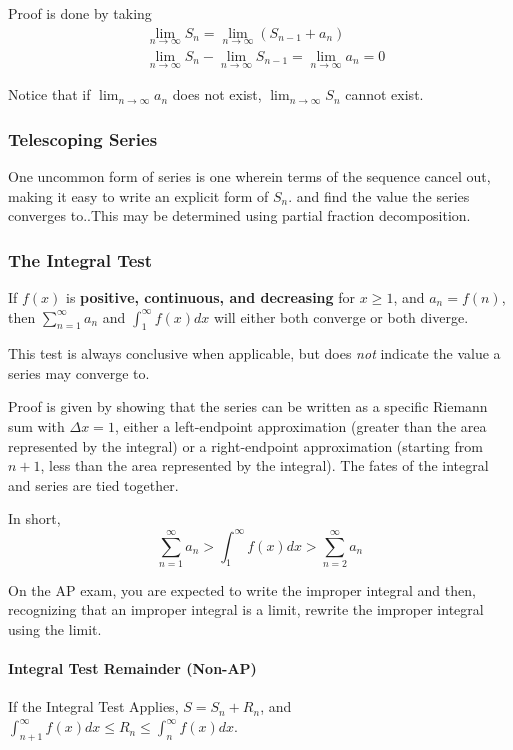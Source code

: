 \documentclass{article}
\begin{document}
Proof is done by taking
\begin{align*}
    &\lim_{n\to \infty} S_n = \lim_{n\to \infty} \left( S_{n-1} + a_{n} \right) \\
    &\lim_{n\to \infty} S_n - \lim_{n\to \infty} S_{n-1} = \lim_{n\to \infty} a_n = 0
\end{align*}

Notice that if $\lim_{n\to \infty} a_n$ does not exist, $\lim_{n\to \infty} S_n$ cannot exist.

\subsubsection{Telescoping Series} One uncommon form of series is one wherein terms of the sequence cancel out, making it easy to write an explicit form of $S_n$. and find the value the series converges to..This may be determined using partial fraction decomposition.

\subsubsection{The Integral Test} If $f(x)$ is \textbf{positive, continuous, and decreasing} for $x\ge1$, and $a_n = f(n)$, then $\sum_{n=1}^{\infty} a_n$ and $\int_{1}^{\infty} f(x) dx$ will either both converge or both diverge.

This test is always conclusive when applicable, but does \emph{not} indicate the value a series may converge to.

Proof is given by showing that the series can be written as a specific Riemann sum with $\Delta x = 1$, either a left-endpoint approximation (greater than the area represented by the integral) or a right-endpoint approximation (starting from $n+1$, less than the area represented by the integral). The fates of the integral and series are tied together.

In short,
$$\sum_{n=1}^{\infty} a_n > \int_{1}^{\infty} f(x)dx > \sum_{n=2}^{\infty} a_n$$

On the AP exam, you are expected to write the improper integral and then, recognizing that an improper integral is a limit, rewrite the improper integral using the limit.

\paragraph{Integral Test Remainder (Non-AP)} If the Integral Test Applies, $S=S_n+R_n$, and $\int_{n+1}^{\infty} f(x)dx \le R_n \le \int_{n}^{\infty} f(x)dx$.
\end{document}
